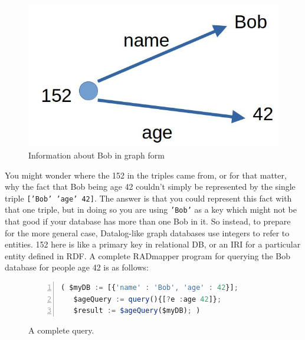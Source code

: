 \documentclass[10pt,letterpaper]{article} %
\newcommand{\stt}[1]{\texttt{#1}} %
\providecommand{\DIFadd}[1]{{\protect\color{blue}\uwave{#1}}} %
\providecommand{\DIFaddFL}[1]{\DIFadd{#1}} %
\providecommand{\DIFaddbeginFL}{} %
\providecommand{\DIFaddendFL}{} %
\newcommand{\DIFaddincludegraphics}[2][]{{\color{blue}\fbox{\DIFOincludegraphics[#1]{#2}}}} %
\DeclareRobustCommand{\DIFaddbeginFL}{\DIFOaddbeginFL \let\includegraphics\DIFaddincludegraphics} %
\DeclareRobustCommand{\DIFaddendFL}{\DIFOaddendFL \let\includegraphics\DIFOincludegraphics} %
\begin{document}
\begin{figure}[H]
  \caption{Information about Bob in graph form\DIFaddbeginFL \DIFaddFL{.}\DIFaddendFL }
  \label{fig:bob-as-a-graph}
     \includegraphics[scale=0.15]{bob-age-42.jpg}
  \centering
\end{figure}

You might wonder where the 152 in the triples came from, or for that matter, why the fact that Bob being age 42 couldn't
simply be represented by the single triple \stt{['Bob' 'age' 42]}.
The answer is that you could represent this fact with that one triple, but in doing so you are using \stt{'Bob'} as a key
which might not be that good if your database has more than one Bob in it.
So instead, to prepare for the more general case, Datalog-like graph databases use integers to refer to entities.
152 here is like a primary key in relational DB, or an IRI for a particular entity defined in RDF.
A complete RADmapper program for querying the Bob database for people age 42 is as follows:

\begin{figure}[H]
  \caption{A complete query.}
  \label{code:bob-age}
\begin{lstlisting}[language=JavaScript,numberstyle=\scriptsize,basicstyle=\ttfamily\scriptsize,numbers=left,stepnumber=1,breaklines=true]
 ( $myDB := [{'name' : 'Bob', 'age' : 42}];
   $ageQuery := query(){[?e :age 42]};
   $result := $ageQuery($myDB); )
\end{lstlisting}
\end{figure} \vspace{-3em}

\end{document}
